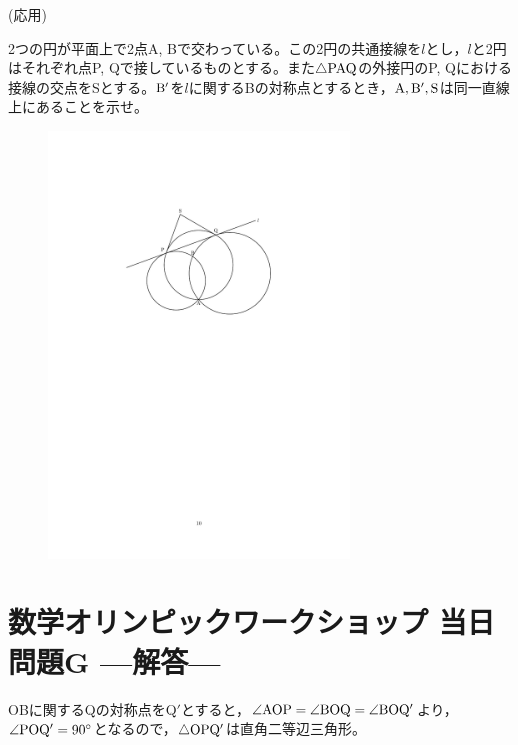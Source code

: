 \documentclass[a4paper,12pt,uplatex]{jsarticle}  %
\begin{document}
 (応用)

2つの円が平面上で2点A, Bで交わっている。この2円の共通接線を$l$とし，$l$と2円はそれぞれ点P, Qで接しているものとする。また$\triangle {\rm PAQ}$の外接円のP, Qにおける接線の交点をSとする。$\rm B'$を$l$に関するBの対称点とするとき，$\rm A, B', S$は同一直線上にあることを示せ。

\begin{figure}[ht]
  \centering
  \includegraphics[width=8.0cm]{toujitsu_7_problem.pdf}
\end{figure}









\newpage

\section*{数学オリンピックワークショップ 当日問題G ---解答---}


OBに関するQの対称点をQ$'$とすると，$\angle {\rm AOP} = \angle {\rm BOQ} = \angle {\rm BOQ'}$より，$\angle {\rm POQ'} = 90^{\circ}$となるので，$\triangle{\rm OPQ'}$は直角二等辺三角形。
\end{document}
